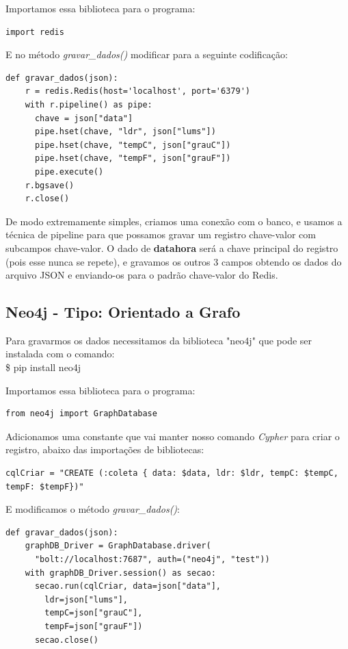 \documentclass[a4paper,11pt]{article}
\begin{document}
Importamos essa biblioteca para o programa:
\begin{lstlisting}[]
import redis
\end{lstlisting}

E no método \textit{gravar\_dados()} modificar para a seguinte codificação:
\begin{lstlisting}[]
  def gravar_dados(json):
    r = redis.Redis(host='localhost', port='6379')
    with r.pipeline() as pipe:
      chave = json["data"]
      pipe.hset(chave, "ldr", json["lums"])
      pipe.hset(chave, "tempC", json["grauC"])
      pipe.hset(chave, "tempF", json["grauF"])
      pipe.execute()
    r.bgsave()
    r.close()
\end{lstlisting}

De modo extremamente simples, criamos uma conexão com o banco, e usamos a técnica de pipeline para que possamos gravar um registro chave-valor com subcampos chave-valor. O dado de \textbf{datahora} será a chave principal do registro (pois esse nunca se repete), e gravamos os outros 3 campos obtendo os dados do arquivo JSON e enviando-os para o padrão chave-valor do Redis.

\subsection*{Neo4j - Tipo: Orientado a Grafo}
Para gravarmos os dados necessitamos da biblioteca "neo4j" que pode ser instalada com o comando: \\
{\ttfamily\$ pip install neo4j}

Importamos essa biblioteca para o programa:
\begin{lstlisting}[]
from neo4j import GraphDatabase
\end{lstlisting}

Adicionamos uma constante que vai manter nosso comando \textit{Cypher} para criar o registro, abaixo das importações de bibliotecas:
\begin{lstlisting}[]
cqlCriar = "CREATE (:coleta { data: $data, ldr: $ldr, tempC: $tempC, tempF: $tempF})"	
\end{lstlisting}

E modificamos o método \textit{gravar\_dados()}:
\begin{lstlisting}[]
  def gravar_dados(json):
    graphDB_Driver = GraphDatabase.driver(
      "bolt://localhost:7687", auth=("neo4j", "test"))
    with graphDB_Driver.session() as secao:
      secao.run(cqlCriar, data=json["data"],
        ldr=json["lums"], 
        tempC=json["grauC"], 
        tempF=json["grauF"])
      secao.close()
\end{lstlisting}
\end{document}
